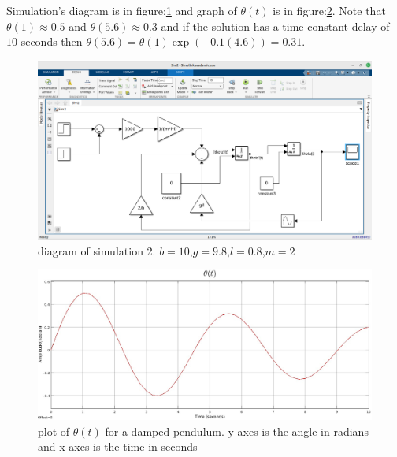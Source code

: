Simulation's diagram is in figure:\ref{sim:2} and graph of $\theta(t)$ is in figure:\ref{fig:sim2}. Note that $\theta(1)\approx 0.5$ and $\theta(5.6)\approx 0.3$ and if the solution has a time constant delay of $10$ seconds then $\theta(5.6)=\theta(1)\exp(-0.1(4.6))=0.31$.
\begin{figure}
    \centering
    \includegraphics[width=\textwidth]{assets/hw1_sim2.png}
    \caption{diagram of simulation 2. $b=10$,$g=9.8$,$l=0.8$,$m=2$}
    \label{sim:2}
\end{figure}
\begin{figure}
    \centering
    \includegraphics[width=\textwidth]{assets/hw1_3_6.jpg}
    \caption{plot of $\theta(t)$ for a damped pendulum. y axes is the angle in radians and x axes is the time in seconds}
    \label{fig:sim2}
\end{figure}